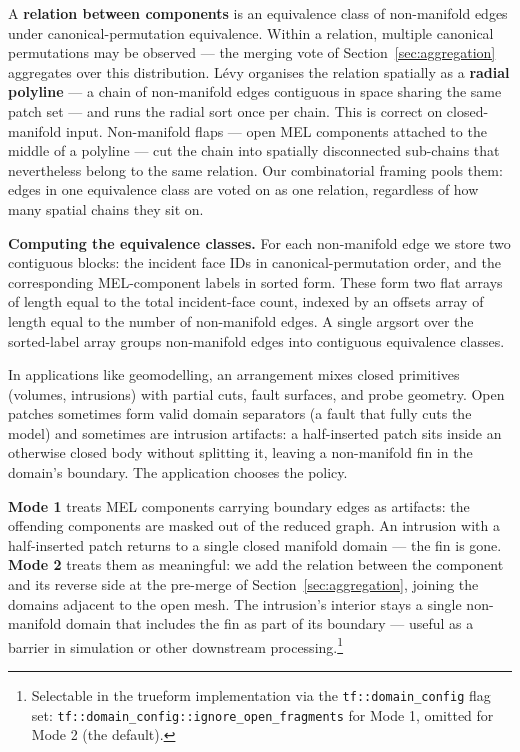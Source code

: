 \documentclass{egpubl}
\begin{document}
A \textbf{relation between components} is an equivalence class of non-manifold edges under canonical-permutation equivalence. Within a relation, multiple canonical permutations may be observed --- the merging vote of Section~\ref{sec:aggregation} aggregates over this distribution. L\'evy organises the relation spatially as a \textbf{radial polyline} \cite{Levy2025} --- a chain of non-manifold edges contiguous in space sharing the same patch set --- and runs the radial sort once per chain. This is correct on closed-manifold input. Non-manifold flaps --- open MEL components attached to the middle of a polyline --- cut the chain into spatially disconnected sub-chains that nevertheless belong to the same relation. Our combinatorial framing pools them: edges in one equivalence class are voted on as one relation, regardless of how many spatial chains they sit on.

\textbf{Computing the equivalence classes.} For each non-manifold edge we store two contiguous blocks: the incident face IDs in canonical-permutation order, and the corresponding MEL-component labels in sorted form. These form two flat arrays of length equal to the total incident-face count, indexed by an offsets array of length equal to the number of non-manifold edges. A single argsort over the sorted-label array groups non-manifold edges into contiguous equivalence classes.

In applications like geomodelling, an arrangement mixes closed primitives (volumes, intrusions) with partial cuts, fault surfaces, and probe geometry. Open patches sometimes form valid domain separators (a fault that fully cuts the model) and sometimes are intrusion artifacts: a half-inserted patch sits inside an otherwise closed body without splitting it, leaving a non-manifold fin in the domain's boundary. The application chooses the policy.

\textbf{Mode 1} treats MEL components carrying boundary edges as artifacts: the offending components are masked out of the reduced graph. An intrusion with a half-inserted patch returns to a single closed manifold domain --- the fin is gone. \textbf{Mode 2} treats them as meaningful: we add the relation between the component and its reverse side at the pre-merge of Section~\ref{sec:aggregation}, joining the domains adjacent to the open mesh. The intrusion's interior stays a single non-manifold domain that includes the fin as part of its boundary --- useful as a barrier in simulation or other downstream processing.\footnote{Selectable in the trueform implementation via the \texttt{tf::domain\_config} flag set: \texttt{tf::domain\_config::ignore\_open\_fragments} for Mode 1, omitted for Mode 2 (the default).}
\end{document}

